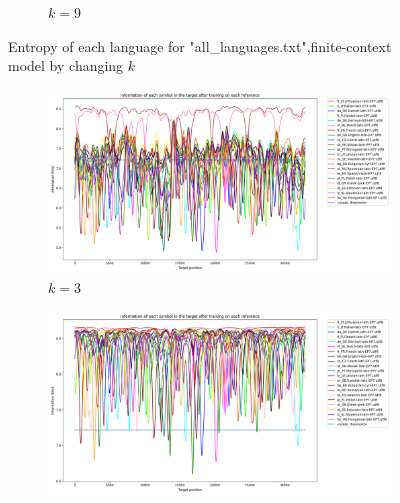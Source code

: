 \documentclass{article}
\begin{document}
\begin{figure}
\begin{subfigure}[b]{0.3\textwidth}
\begin{center}
        \end{center}
        \caption{$k = 9$}
        \label{fig:all_languages_p_c:1:9}
    \end{subfigure}
    
    \caption{Entropy of each language for "all_languages.txt",finite-context model by changing $k$}
    \label{fig:all_languages_p_c:k}
\end{figure}

\begin{figure}
    \begin{subfigure}[b]{0.3\textwidth}
        \begin{center}
            \includegraphics[width=1.0\linewidth]{../results/all_languages_random/-p_c:1:3.png}
        \end{center}
        \caption{$k = 3$}
        \label{fig:all_languages_random_p_c:1:3}
    \end{subfigure}
    \hfill
    \begin{subfigure}[b]{0.3\textwidth}
        \begin{center}
            \includegraphics[width=1.0\linewidth]{../results/all_languages_random/-p_c:1:6.png}
        \end{center}

\end{subfigure}
\end{figure}
\end{document}
